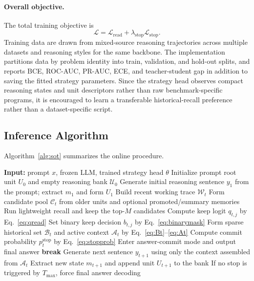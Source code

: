 \documentclass{article}
\begin{document}
\paragraph{Overall objective.}
The total training objective is
\begin{equation}
\mathcal{L}=\mathcal{L}_{\mathrm{read}}+\lambda_{\mathrm{stop}}\mathcal{L}_{\mathrm{stop}}.
\label{eq:lossall}
\end{equation}
Training data are drawn from mixed-source reasoning trajectories across multiple datasets and reasoning styles for the same backbone. The implementation partitions data by problem identity into train, validation, and hold-out splits, and reports BCE, ROC-AUC, PR-AUC, ECE, and teacher-student gap in addition to saving the fitted strategy parameters. Since the strategy head observes compact reasoning states and unit descriptors rather than raw benchmark-specific programs, it is encouraged to learn a transferable historical-recall preference rather than a dataset-specific script.

\subsection{Inference Algorithm}
\label{sec:algo}
Algorithm~\ref{alg:sot} summarizes the online procedure.

\begin{algorithm}[t]
\caption{SoT Inference (State-Driven Sparse Historical Activation)}
\label{alg:sot}
\begin{algorithmic}[1]
\STATE \textbf{Input:} prompt $x$, frozen LLM, trained strategy head $\theta$
\STATE Initialize prompt root unit $U_0$ and empty reasoning bank $\mathcal{U}_0$
\STATE Generate initial reasoning sentence $y_1$ from the prompt; extract $m_1$ and form $U_1$
    \STATE Build recent working trace $\mathcal{W}_t$
    \STATE Form candidate pool $\mathcal{C}_t$ from older units and optional promoted/summary memories
    \STATE Run lightweight recall and keep the top-$M$ candidates
        \STATE Compute keep logit $q_{t,j}$ by Eq.~\eqref{eq:qread}
        \STATE Set binary keep decision $b_{t,j}$ by Eq.~\eqref{eq:binarymask}
    \ENDFOR
    \STATE Form sparse historical set $\mathcal{B}_t$ and active context $\mathcal{A}_t$ by Eq.~\eqref{eq:Bt}--\eqref{eq:At}
    \STATE Compute commit probability $p_t^{\mathrm{stop}}$ by Eq.~\eqref{eq:stopprob}
        \STATE Enter answer-commit mode and output final answer
        \STATE \textbf{break}
    \ENDIF
    \STATE Generate next sentence $y_{t+1}$ using only the context assembled from $\mathcal{A}_t$
    \STATE Extract new state $m_{t+1}$ and append unit $U_{t+1}$ to the bank
\ENDFOR
\STATE If no stop is triggered by $T_{\max}$, force final answer decoding
\end{algorithmic}
\end{algorithm}
\end{document}
